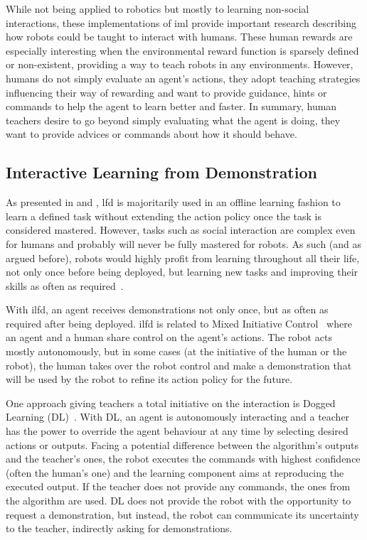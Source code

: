 While not being applied to robotics but mostly to learning non-social interactions, these implementations of \gls{iml} provide important research describing how robots could be taught to interact with humans. These human rewards are especially interesting when the environmental reward function is sparsely defined or non-existent, providing a way to teach robots in any environments. However, humans do not simply evaluate an agent's actions, they adopt teaching strategies influencing their way of rewarding and want to provide guidance, hints or commands to help the agent to learn better and faster. In summary, human teachers desire to go beyond simply evaluating what the agent is doing, they want to provide advices or commands about how it should behave.


\subsection{Interactive Learning from Demonstration} \label{ssec:back_ilfd}

As presented in \cite{argall2009survey} and \cite{billard2008robot}, \gls{lfd} is majoritarily used in an offline learning fashion to learn a defined task without extending the action policy once the task is considered mastered. However, tasks such as social interaction are complex even for humans and probably will never be fully mastered for robots. As such (and as argued before), robots would highly profit from learning throughout all their life, not only once before being deployed, but learning new tasks and improving their skills as often as required~\citep{dautenhahn2004robots}.

With \gls{ilfd}, an agent receives demonstrations not only once, but as often as required after being deployed. \gls{ilfd} is related to Mixed Initiative Control~\citep{adams2004mixed} where an agent and a human share control on the agent's actions. The robot acts mostly autonomously, but in some cases (at the initiative of the human or the robot), the human takes over the robot control and make a demonstration that will be used by the robot to refine its action policy for the future.

One approach giving teachers a total initiative on the interaction is Dogged Learning (DL)~\citep{grollman2007dogged}. With DL, an agent is autonomously interacting and a teacher has the power to override the agent behaviour at any time by selecting desired actions or outputs. Facing a potential difference between the algorithm's outputs and the teacher's ones, the robot executes the commands with highest confidence (often the human's one) and the learning component aims at reproducing the executed output. If the teacher does not provide any commands, the ones from the algorithm are used. DL does not provide the robot with the opportunity to request a demonstration, but instead, the robot can communicate its uncertainty to the teacher, indirectly asking for demonstrations. 


